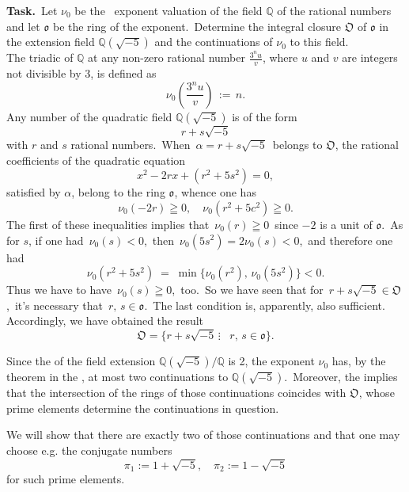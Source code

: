 \documentclass[12pt]{article}
\theoremstyle{definition}
\begin{document}
 
\textbf{Task.}\, Let $\nu_0$ be the \, exponent valuation of the field $\mathbb{Q}$ of the rational numbers and let $\mathfrak{o}$ be the ring of the exponent.\, Determine the integral closure $\mathfrak{O}$ of $\mathfrak{o}$ in the extension field $\mathbb{Q}(\sqrt{-5})$ and the continuations of $\nu_0$ to this field.\\

The triadic  of $\mathbb{Q}$ at any non-zero rational number $\displaystyle\frac{3^nu}{v}$, where $u$ and $v$ are integers not divisible by 3, is defined as
$$\nu_0\left(\frac{3^nu}{v}\right) \,:=\, n.$$
Any number of the quadratic field $\mathbb{Q}(\sqrt{-5})$ is of the form
$$r+s\sqrt{-5}$$
with $r$ and $s$ rational numbers.\, When\, $\alpha = r+s\sqrt{-5}$\, belongs to $\mathfrak{O}$, the rational coefficients of the quadratic equation
$$x^2-2rx+(r^2+5s^2) = 0,$$
satisfied by $\alpha$, belong to the ring $\mathfrak{o}$, whence one has
$$\nu_0(-2r) \geqq 0, \quad \nu_0(r^2+5c^2) \geqq 0.$$
The first of these inequalities implies that\, $\nu_0(r) \geqq 0$\, since $-2$ is a unit of $\mathfrak{o}$.\, As for $s$, if one had\, $\nu_0(s) < 0$,\, then\, $\nu_0(5s^2) = 2\nu_0(s) < 0$,\, and therefore one had
$$\nu_0(r^2+5s^2) \;=\; \min\{\nu_0(r^2),\,\nu_0(5s^2)\} < 0.$$
Thus we have to have \,$\nu_0(s) \geqq 0$,\, too.\, So we have seen that for\, $r+s\sqrt{-5} \in \mathfrak{O}$,\, it's necessary that\, $r,\,s \in \mathfrak{o}$.\, The last condition is, apparently, also sufficient.\, Accordingly, we have obtained the result
$$\mathfrak{O} = \{r\!+\!s\sqrt{-5}\,\vdots\;\;\; r,\,s \in \mathfrak{o}\}.$$

Since the  of the field extension $\mathbb{Q}(\sqrt{-5})/\mathbb{Q}$ is 2, the exponent $\nu_0$ has, by the theorem in the , at most two continuations to $\mathbb{Q}(\sqrt{-5})$.\, Moreover, the  implies that the intersection of the rings of those continuations coincides with $\mathfrak{O}$, whose  prime elements determine the continuations in question.

We will show that there are exactly two of those continuations and that one may choose e.g. the conjugate numbers
$$\pi_1 := 1+\sqrt{-5}, \quad \pi_2 := 1-\sqrt{-5}$$
for such prime elements.
\end{document}
